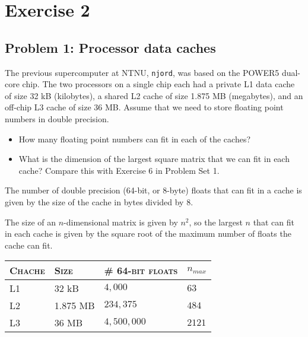 
\section{Exercise 2} %
\label{sec:exercise_2}


\subsection{Problem 1: Processor data caches} %
\label{sec:exercise_1}
\begin{question}
  The previous supercomputer at NTNU, \texttt{njord}, was based on the POWER5 dual-core chip. The two processors on a single chip each had a private L1 data cache of size 32 kB (kilobytes), a shared L2 cache of size 1.875 MB (megabytes), and an off-chip L3 cache of size 36 MB. Assume that we need to store floating point numbers in double precision.

  \begin{itemize}
    \item How many floating point numbers can fit in each of the caches?
    \item What is the dimension of the largest square matrix that we can fit in each cache? Compare this with Exercise 6  in Problem Set 1.
  \end{itemize}
\end{question}


The number of double precision (64-bit, or 8-byte) floats that can fit in a cache is given by the size of the cache in bytes divided by 8.

The size of an $n$-dimensional matrix is given by $n^2$, so the largest $n$ that can fit in each cache is given by the square root of the maximum number of floats the cache can fit.

\begin{center}
  \begin{tabular}{llll}
  \toprule
  \textsc{Chache} & \textsc{Size} & \# \textsc{64-bit floats} & $n_{max}$  \\
  \midrule
  L1 & 32 kB    & $4,000$     & $63$ \\
  L2 & 1.875 MB & $234,375$   & $484$ \\
  L3 & 36 MB    & $4,500,000$ & $2121$ \\
  \bottomrule
  \end{tabular}
\end{center}
\pagebreak


